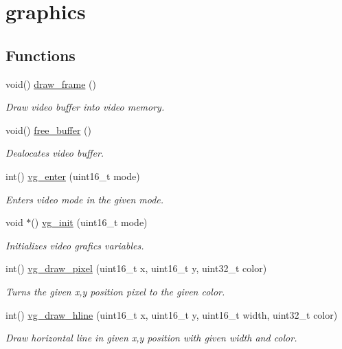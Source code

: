 \hypertarget{group__graphics}{}\section{graphics}
\label{group__graphics}
\subsection*{Functions}
\begin{DoxyCompactItemize}
\item 
void() \hyperlink{group__graphics_gae70314d2e6e41dae20ce327a13929401}{draw\+\_\+frame} ()
\begin{DoxyCompactList}\small\item\em Draw video buffer into video memory. \end{DoxyCompactList}\item 
void() \hyperlink{group__graphics_ga427099c53976d605666e7e2b39238bb9}{free\+\_\+buffer} ()
\begin{DoxyCompactList}\small\item\em Dealocates video buffer. \end{DoxyCompactList}\item 
int() \hyperlink{group__graphics_gac34ed31db6d6ef68b7167a0c024cac2b}{vg\+\_\+enter} (uint16\+\_\+t mode)
\begin{DoxyCompactList}\small\item\em Enters video mode in the given mode. \end{DoxyCompactList}\item 
void $\ast$() \hyperlink{group__graphics_gaa6c1ff5024cd4d15e476bce487584daa}{vg\+\_\+init} (uint16\+\_\+t mode)
\begin{DoxyCompactList}\small\item\em Initializes video grafics variables. \end{DoxyCompactList}\item 
int() \hyperlink{group__graphics_ga08c498ffeb0a3962e3b7711b57397741}{vg\+\_\+draw\+\_\+pixel} (uint16\+\_\+t x, uint16\+\_\+t y, uint32\+\_\+t color)
\begin{DoxyCompactList}\small\item\em Turns the given x,y position pixel to the given color. \end{DoxyCompactList}\item 
int() \hyperlink{group__graphics_ga1677f4b59f9e0584d82e0b655e4b7fc9}{vg\+\_\+draw\+\_\+hline} (uint16\+\_\+t x, uint16\+\_\+t y, uint16\+\_\+t width, uint32\+\_\+t color)
\begin{DoxyCompactList}\small\item\em Draw horizontal line in given x,y position with given width and color. \end{DoxyCompactList}\item 

\end{DoxyCompactItemize}
